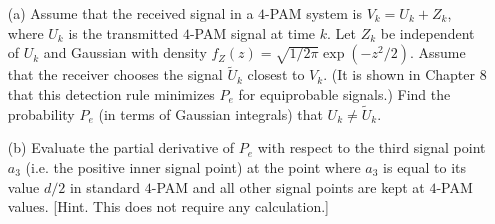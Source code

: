 \documentclass{assignment}
\begin{document}
\begin{prob}[6.3]
    \begin{itemize}
        \item[(a)] Assume that the received signal in a $4$-PAM system is $V_k=U_k+Z_k$, where $U_k$ is the transmitted $4$-PAM signal at time $k$. Let $Z_k$ be independent of $U_k$ and Gaussian with density $f_Z(z)=\sqrt{1/2\pi}\exp(-z^2/2)$. Assume that the receiver chooses the signal $\tilde{U}_k$ closest to $V_k$. (It is shown in Chapter 8 that this detection rule minimizes $P_e$ for equiprobable signals.) Find the probability $P_e$ (in terms of Gaussian integrals) that $U_k\neq\tilde{U}_k$.
        \item[(b)] Evaluate the partial derivative of $P_e$ with respect to the third signal point $a_3$ (i.e. the positive inner signal point) at the point where $a_3$ is equal to its value $d/2$ in standard $4$-PAM and all other signal points are kept at $4$-PAM values. [Hint. This does not require any calculation.]
    \end{itemize}
\end{prob}
\end{document}
